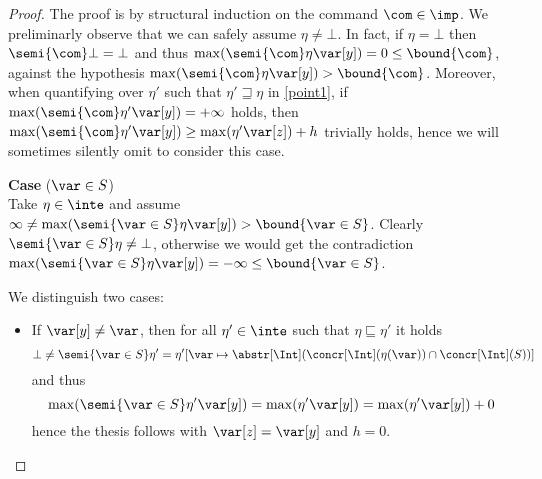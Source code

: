 \begin{proof}
   The proof is by
  structural induction on the command \(\com\in \imp\).
  We preliminarly observe that we can safely assume
  \(\eta \neq \bot\).
  In fact, if \(\eta = \bot\) then \(\semi{\com} \bot = \bot\) and
  thus \(\max(\semi{\com} \eta \var[y]) = 0 \leq \bound{\com}\),
  against the hypothesis
  \(\max(\semi{\com}\eta \var[y]) > \bound{\com}\). Moreover, when
  quantifying over \(\eta'\) such that \(\eta' \sqsupseteq \eta\) in
  \ref{point1}, if \(\max(\semi{\com}\eta' \var[y]) = + \infty\)
  holds, then
  \(\max(\semi{\com}\eta' \var[y]) \geq \max(\eta' \var[z]) + h\)
  trivially holds, hence we will sometimes silently omit to consider
  this case.
  
  \medskip
  
  \noindent
  \textbf{Case} (\(\var \in S\))\\
  Take \(\eta \in \inte\) and assume
  \(\infty\neq\max(\semi{\var \in S}\eta \var[y]) > \bound{\var \in S}\).
  Clearly \(\semi{\var \in S}\eta \neq \bot\), otherwise we would get
  the contradiction
  \(\max(\semi{\var \in S}\eta \var[y]) = -\infty \leq \bound{\var \in
    S}\).
  
  We distinguish two cases:
  \begin{itemize}
    
  \item If \(\var[y] \neq \var\), then for all \(\eta' \in \inte\) such
    that \(\eta \sqsubseteq \eta'\) it holds
    \[\bot \neq \semi{\var \in S}\eta' = \eta'[\var \mapsto
      {\abstr[\Int](\concr[\Int](\eta(\var)) \cap \concr[\Int](S))}]\]
    and thus
    \begin{equation*}
      \max(\semi{\var \in S}\eta' \var[y]) = \max(\eta' \var[y]) = \max(\eta' \var[y]) + 0
    \end{equation*}
    hence the thesis follows with \(\var[z]=\var[y]\) and \(h = 0\).


\end{itemize}
\end{proof}
